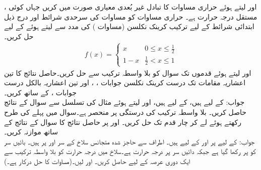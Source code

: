 \quad {} \quad
{}،  اور  لیتے ہوئے حراری مساوات  کا تبادل غیر بُعدی معیاری صورت   میں کریں جہاں  کوئی مستقل درجہ حرارت ہے۔
\quad
حراری مساوات  کو مساوات  کی سرحدی شرائط اور درج ذیل ابتدائی شرائط کے لیے ترکیب کرینک نکلسن (مساوات ) کی مدد سے   لیتے ہوئے  کے لیے حل کریں۔
\begin{align*}
f(x)=
\begin{cases}
x& 0\le x\le \tfrac{1}{2}\\
1-x&\tfrac{1}{2}< x\le 1
\end{cases}
\end{align*}
\quad
{} اور  لیتے ہوئے  قدموں تک سوال  کو بلا واسطہ ترکیب سے حل کریں۔حاصل نتائج کا تین اعشاریہ مقامات تک درست کرینک نکلسن جوابات ، ، اور تین اعشاریہ بالکل درست جوابات ،  کے ساتھ کریں۔\\
جواب:\quad
{} کے لیے  ہیں،  کے لیے  ہیں، 
\quad
{} اور  لیتے ہوئے  مثال  کی تسلسل سے سوال  کے نتائج حاصل کریں۔
\quad
بلا واسطہ ترکیب کی درستگی  پر منحصر ہے۔سوال  میں پہلے کی طرح  رکھتے ہوئے   لے کر چار قدم تک حل کریں۔ اور  پر حاصل نتائج کا سوال  کے نتائج کے ساتھ موازنہ کریں۔ \\
جواب:\quad
{} کے لیے  پر  اور
  کے لیے  ہیں۔
\quad
اطراف سے حاجز شدہ متجانس سلاخ کے سر  اور   پر ہیں۔ بائیں سر کو  پر رکھا گیا ہے  جبکہ  دائیں سر  پر درجہ حرارت  ہے۔سلاخ میں درجہ حرارت کو بلا واسطہ ترکیب سے ایک دوری عرصہ  کے لیے حاصل کریں۔ اور  لیں۔(مساوات  کا حل درکار ہے۔)
